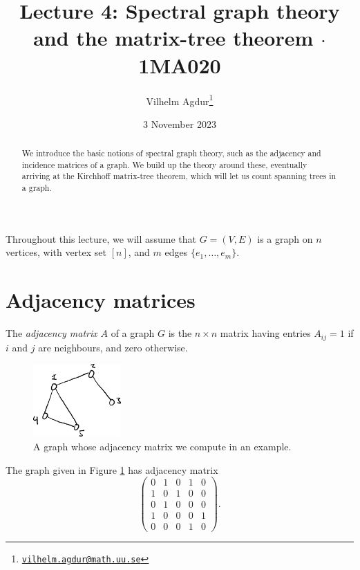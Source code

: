 \documentclass[nobib]{tufte-handout}
\title{Lecture 4: Spectral graph theory and the matrix-tree theorem $\cdot$ 1MA020}
\author[Vilhelm Agdur]{Vilhelm Agdur\thanks{\href{mailto:vilhelm.agdur@math.uu.se}{\nolinkurl{vilhelm.agdur@math.uu.se}}}}
\date{3 November 2023}
\begin{document}
\maketitle%

\begin{abstract}
\noindent
We introduce the basic notions of spectral graph theory, such as the adjacency and incidence matrices of a graph. We build up the theory around these, eventually arriving at the Kirchhoff matrix-tree theorem, which will let us count spanning trees in a graph.
\end{abstract}

Throughout this lecture, we will assume that $G = (V, E)$ is a graph on $n$ vertices, with vertex set $[n]$, and $m$ edges $\{e_1, \ldots, e_m\}$.

\section{Adjacency matrices}

\begin{definition}
    The \emph{adjacency matrix} $A$ of a graph $G$ is the $n\times n$ matrix having entries $A_{ij} = 1$ if $i$ and $j$ are neighbours, and zero otherwise.
\end{definition}

\begin{figure}
    \centering
    \includegraphics[width=0.3\textwidth]{graphics/L4_spectral/graph_for_adjmat.png}
    \caption{A graph whose adjacency matrix we compute in an example.}
    \label{fig:graph_for_adjmat}
\end{figure}

\begin{example}
    The graph given in Figure \ref{fig:graph_for_adjmat} has adjacency matrix
    $$\begin{pmatrix}
        0 & 1 & 0 & 1 & 0 \\
        1 & 0 & 1 & 0 & 0 \\
        0 & 1 & 0 & 0 & 0 \\
        1 & 0 & 0 & 0 & 1 \\
        0 & 0 & 0 & 1 & 0 
        \end{pmatrix}.$$
\end{example}
\end{document}

